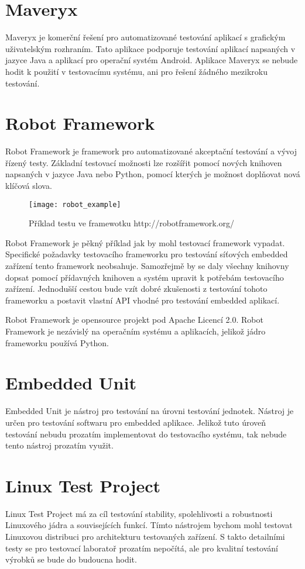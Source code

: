 \section{Maveryx}
Maveryx je komerční řešení pro automatizované testování aplikací s grafickým uživatelským rozhraním. Tato aplikace podporuje testování aplikací napsaných v jazyce Java a aplikací pro operační systém Android. Aplikace Maveryx se nebude hodit k použití v testovacímu systému, ani pro řešení žádného mezikroku testování.

\section{Robot Framework}
Robot Framework je framework pro automatizované akceptační testování a vývoj řízený testy. Základní testovací možnosti lze rozšířit pomocí nových knihoven napsaných v jazyce Java nebo Python, pomocí kterých je možnost doplňovat nová klíčová slova.

\begin{figure}[h]
  \centering
  \texttt{[image: robot\_example]}
  \caption{Příklad testu ve framewotku http://robotframework.org/}
  \label{fig:robot_example}
\end{figure}

Robot Framework je pěkný příklad jak by mohl testovací framework vypadat. Specifické požadavky testovacího frameworku pro testování síťových embedded zařízení tento framework neobsahuje. Samozřejmě by se daly všechny knihovny dopsat pomocí přídavných knihoven a systém upravit k potřebám testovacího zařízení. Jednodušší cestou bude vzít dobré zkušenosti z testování tohoto frameworku a postavit vlastní API vhodné pro testování embedded aplikací.

Robot Framework je opensource projekt pod Apache Licencí 2.0. Robot Framework je nezávislý na operačním systému a aplikacích, jelikož jádro frameworku používá Python.

\section{Embedded Unit}
Embedded Unit je nástroj pro testování na úrovni testování jednotek. Nástroj je určen pro testování softwaru pro embedded aplikace. Jelikož tuto úroveň testování nebudu prozatím implementovat do testovacího systému, tak nebude tento nástroj prozatím využit.

\section{Linux Test Project}
Linux Test Project má za cíl testování stability, spolehlivosti a robustnosti Linuxového jádra a souvisejících funkcí. Tímto nástrojem bychom mohl testovat Linuxovou distribuci pro architekturu testovaných zařízení. S takto detailními testy se pro testovací laboratoř prozatím nepočítá, ale pro kvalitní testování výrobků se bude do budoucna hodit.

